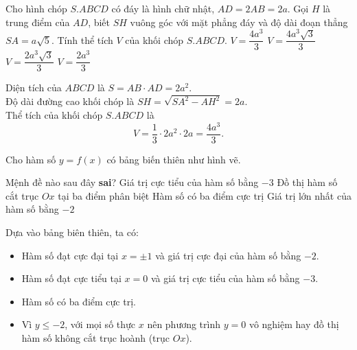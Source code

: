 \begin{ex}%
 Cho hình chóp $S.ABCD$ có đáy là hình chữ nhật, $AD = 2AB = 2a$. Gọi $H$ là trung điểm của $AD$, biết $SH$ vuông góc với mặt phẳng đáy và độ dài đoạn thẳng $SA = a\sqrt{5}$. Tính thể tích $V$ của khối chóp $S.ABCD$.
 \choice
  {\True $V = \dfrac{4a^3}{3}$}
  {$V = \dfrac{4a^3\sqrt{3}}{3}$}
  {$V = \dfrac{2a^3\sqrt{3}}{3}$}
  {$V = \dfrac{2a^3}{3}$}
 \loigiai
  {
  \immini
  {
  Diện tích của $ABCD$ là $S = AB \cdot AD = 2a^2$.\\
  Độ dài đường cao khối chóp là $SH = \sqrt{SA^2 - AH^2} = 2a$.\\
  Thể tích của khối chóp $S.ABCD$ là
  $$V = \dfrac{1}{3} \cdot 2a^2 \cdot 2a = \dfrac{4a^3}{3}.$$
  }
  {
  }
  }
\end{ex}

\begin{ex}%
 Cho hàm số $y = f(x)$ có bảng biến thiên như hình vẽ.
 \begin{center}
 \end{center}
 Mệnh đề nào sau đây \textbf{sai}?
 \choice
  {Giá trị cực tiểu của hàm số bằng $-3$}
  {\True Đồ thị hàm số cắt trục $Ox$ tại ba điểm phân biệt}
  {Hàm số có ba điểm cực trị}
  {Giá trị lớn nhất của hàm số bằng $-2$}
 \loigiai
  {
  Dựa vào bảng biên thiên, ta có:
  \begin{itemize}
   \item Hàm số đạt cực đại tại $x = \pm 1$ và giá trị cực đại của hàm số bằng $-2$.
   \item Hàm số đạt cực tiểu tại $x= 0$ và giá trị cực tiểu của hàm số bằng $-3$.
   \item Hàm số có ba điểm cực trị.
   \item Vì $y \leq -2$, với mọi số thực $x$ nên phương trình $y = 0$ vô nghiệm hay đồ thị hàm số không cắt trục hoành (trục $Ox$).
  \end{itemize}
  }
\end{ex}

